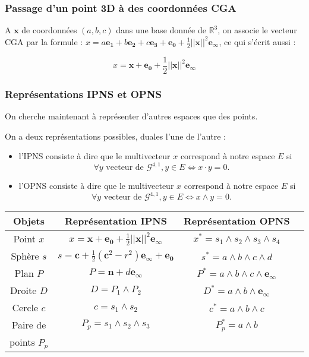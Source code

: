 \documentclass{beamer}
\newcommand{\e}[1]{\bm{e_{#1}}}
\newcommand{\ei}{\e{\infty}}
\newcommand{\ez}{\e{0}}
\newcommand{\R}{\mathbb{R}}
\begin{document}
\begin{frame}
\frametitle{Passage d'un point 3D à des coordonnées CGA}
A $\bm{x}$ de coordonnées $(a,b,c)$ dans une base donnée de $\R^3$, on associe le vecteur CGA par la formule : $x = a \bm{e_1} + b \bm{e_2} + c \bm{e_3} + \bm{e_0} + \frac{1}{2}||\bm{x}||^2 \ei$, ce qui s'écrit aussi : 

$$x = \bm{x} + \bm{e_0} + \frac{1}{2}||\bm{x}||^2 \ei$$

\end{frame}
\begin{frame}
\frametitle{Représentations IPNS et OPNS}
On cherche maintenant à représenter d'autres espaces que des points.\pause

On a deux représentations possibles, duales l'une de l'autre : 
\begin{itemize}
\item l'IPNS consiste à dire que le multivecteur $x$ correspond à notre espace $E$ si $$\forall y \text{ vecteur de } \mathscr{G}^{4,1}, y\in E \Leftrightarrow x \cdot y =0.$$\pause
\item l'OPNS consiste à dire que le multivecteur $x$ correspond à notre espace $E$ si $$\forall y \text{ vecteur de } \mathscr{G}^{4,1}, y\in E \Leftrightarrow x \wedge y =0.$$
\end{itemize}
\end{frame}

\begin{frame}
\begin{table}[h!]
\begin{center}

\begin{tabular}{|c|c|c|c|}
\hline

Objets & Représentation IPNS &  Représentation OPNS  \\\hline
Point $x$ & $x = \bm{x} + \bm{e_0} + \frac{1}{2}||\bm{x}||^2 \ei$ & $x^* = s_1 \wedge s_2 \wedge s_3 \wedge s_4$  \\
\hline

Sphère $s$ &  $s = \bm{c} + \frac{1}{2}(\bm{c}^2-r^2)\ei + \ez$ &  $s^* = a \wedge b \wedge c \wedge d$  \\
\hline

Plan $P$ &  $P = \bm{n} + d\ei$ &  $P^* = a \wedge b \wedge c \wedge \ei$  \\
\hline

Droite $D$  &  $D = P_1 \wedge P_2$ & $D^* = a \wedge b \wedge \ei$  \\\hline

Cercle $c$  & $c = s_1 \wedge s_2$  & $c^* = a \wedge b \wedge c$  \\
\hline

Paire de  &  $P_p = s_1 \wedge s_2 \wedge s_3 $ & $P_p^* = a \wedge b$  \\
points $P_p$ & &\\\hline
\end{tabular}
\end{center}
\renewcommand{\thetable}{\arabic{table}}
\end{table}
\end{frame}
\end{document}
